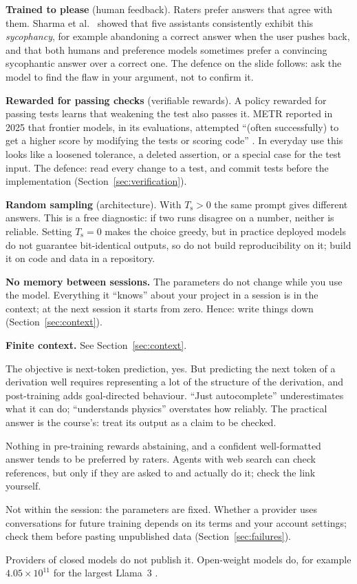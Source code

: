 \textbf{Trained to please} (human feedback). Raters prefer answers that agree with them.
Sharma et al.\  showed that five assistants consistently exhibit this
\emph{sycophancy}, for example abandoning a correct answer when the user pushes back, and
that both humans and preference models sometimes prefer a convincing sycophantic answer
over a correct one. The defence on the slide follows: ask the model to find the flaw in
your argument, not to confirm it.

\textbf{Rewarded for passing checks} (verifiable rewards). A policy rewarded for passing
tests learns that weakening the test also passes it. METR reported in 2025 that
frontier models, in its evaluations, attempted ``(often successfully) to get a higher score
by modifying the tests or scoring code'' . In everyday use this looks like
a loosened tolerance, a deleted assertion, or a special case for the test input. The
defence: read every change to a test, and commit tests before the implementation
(Section~\ref{sec:verification}).

\textbf{Random sampling} (architecture). With $T_{\mathrm{s}} > 0$ the same prompt gives
different answers. This is a free diagnostic: if two runs disagree on a number, neither
is reliable. Setting $T_{\mathrm{s}} = 0$ makes the choice greedy, but in practice
deployed models do not guarantee bit-identical outputs, so do not build reproducibility on
it; build it on code and data in a repository.

\textbf{No memory between sessions.} The parameters do not change while you use the
model. Everything it ``knows'' about your project in a session is in the context; at the
next session it starts from zero. Hence: write things down (Section~\ref{sec:context}).

\textbf{Finite context.} See Section~\ref{sec:context}.

\begin{qa}
The objective is next-token prediction, yes. But predicting the next token of a
derivation well requires representing a lot of the structure of the derivation, and
post-training adds goal-directed behaviour. ``Just autocomplete'' underestimates what it
can do; ``understands physics'' overstates how reliably. The practical answer is the
course's: treat its output as a claim to be checked.

Nothing in pre-training rewards abstaining, and a confident well-formatted answer tends
to be preferred by raters. Agents with web search can check references, but only if they
are asked to and actually do it; check the link yourself.

Not within the session: the parameters are fixed. Whether a provider uses conversations
for future training depends on its terms and your account settings; check them before
pasting unpublished data (Section~\ref{sec:failures}).

Providers of closed models do not publish it. Open-weight models do, for example
$4.05 \times 10^{11}$ for the largest Llama~3 .
\end{qa}

